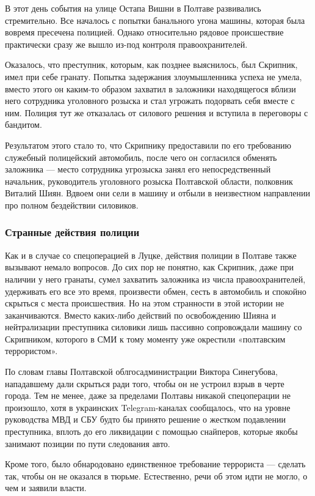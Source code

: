 \documentclass[a4paper,11pt]{extreport}
\begin{document}
В этот день события на улице Остапа Вишни в Полтаве развивались стремительно.
Все началось с попытки банального угона машины, которая была вовремя пресечена
полицией. Однако относительно рядовое происшествие практически сразу же вышло
из-под контроля правоохранителей.

Оказалось, что преступник, которым, как позднее выяснилось, был Скрипник, имел
при себе гранату. Попытка задержания злоумышленника успеха не умела, вместо
этого он каким-то образом захватил в заложники находящегося вблизи него
сотрудника уголовного розыска и стал угрожать подорвать себя вместе с ним.
Полиция тут же отказалась от силового решения и вступила в переговоры с
бандитом. 

Результатом этого стало то, что Скрипнику предоставили по его требованию
служебный полицейский автомобиль, после чего он согласился обменять заложника —
место сотрудника угрозыска занял его непосредственный начальник, руководитель
уголовного розыска Полтавской области, полковник Виталий Шиян. Вдвоем они сели
в машину и отбыли в неизвестном направлении про полном бездействии силовиков.

\subsubsection{Странные действия полиции}

Как и в случае со спецоперацией в Луцке, действия полиции в Полтаве также
вызывают немало вопросов. До сих пор не понятно, как Скрипник, даже при наличии
у него гранаты, сумел захватить заложника из числа правоохранителей, удерживать
его все это время, произвести обмен, сесть в автомобиль и спокойно скрыться с
места происшествия.  Но на этом странности в этой истории не заканчиваются.
Вместо каких-либо действий по освобождению Шияна и нейтрализации преступника
силовики лишь пассивно сопровождали машину со Скрипником, которого в СМИ к тому
моменту уже окрестили «полтавским террористом».

По словам главы Полтавской облгосадминистрации Виктора Синегубова, нападавшему
дали скрыться ради того, чтобы он не устроил взрыв в черте города. Тем не
менее, даже за пределами Полтавы никакой спецоперации не произошло, хотя в
украинских Telegram-каналах сообщалось, что на уровне руководства МВД и СБУ
будто бы принято решение о жестком подавлении преступника, вплоть до его
ликвидации с помощью снайперов, которые якобы занимают позиции по пути
следования авто.

Кроме того, было обнародовано единственное требование террориста --- сделать так,
чтобы он не оказался в тюрьме. Естественно, речи об этом идти не могло, о чем и
заявили власти.
\end{document}
